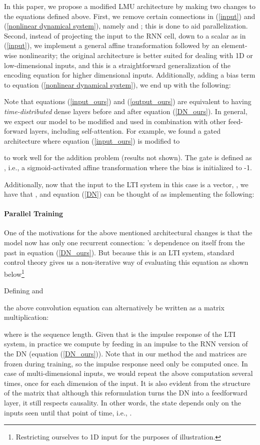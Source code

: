 \documentclass{article}
\begin{document}
In this paper, we propose a modified LMU architecture by making two changes to the equations defined above. First, we remove certain connections in (\ref{input}) and (\ref{nonlinear dynamical system}), namely  and ; this is done to aid parallelization. Second, instead of projecting the input to the RNN cell,  down to a scalar as in (\ref{input}), we implement a general affine transformation followed by an element-wise nonlinearity; the original architecture is better suited for dealing with 1D or low-dimensional inputs, and this is a straightforward generalization of the encoding equation for higher dimensional inputs. Additionally, adding a bias term to equation (\ref{nonlinear dynamical system}), we end up with the following:

Note that equations (\ref{input_ours}) and (\ref{output_ours}) are equivalent to having {\it time-distributed} dense layers before and after equation (\ref{DN_ours}). In general, we expect our model to be modified and used in combination with other feed-forward layers, including self-attention. For example, we found a gated architecture \citep{srivastava2015training} where equation (\ref{input_ours}) is modified to

to work well for the addition problem (results not shown). The gate is defined as , i.e., a sigmoid-activated affine transformation where the bias is initialized to -1.

Additionally, now that the input to the LTI system in this case is a vector, , we have that , and equation (\ref{DN}) can be thought of as implementing the following: 





\paragraph{Parallel Training} One of the motivations for the above mentioned architectural changes is that the model now has only one recurrent connection: 's dependence on itself from the past in equation (\ref{DN_ours}). But because this is an LTI system, standard control theory \citep{aastrom2010feedback} gives us a non-iterative way of evaluating this equation as shown below\footnote{Restricting ourselves to 1D input for the purposes of illustration.} 

Defining  and 

the above convolution equation can alternatively be written as a matrix multiplication:

where  is the sequence length. Given that  is the impulse response of the LTI system, in practice we compute  by feeding in an impulse to the RNN version of the DN (equation (\ref{DN_ours})). Note that in our method the  and  matrices are frozen during training, so the impulse response need only be computed once. In case of multi-dimensional inputs, we would repeat the above computation several times, once for each dimension of the input. It is also evident from the structure of the  matrix that although this reformulation turns the DN into a feedforward layer, it still respects causality. In other words, the state  depends only on the inputs seen until that point of time, i.e., .   
\end{document}
